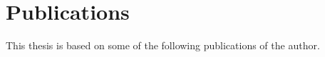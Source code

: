 \chapter*{Publications}
This thesis is based on some of the following publications of the author.\\

